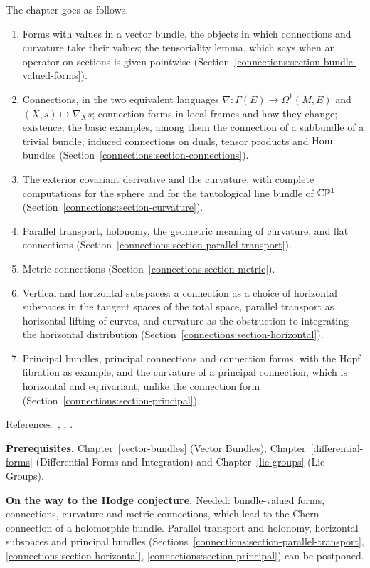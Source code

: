 The chapter goes as follows.
\begin{enumerate}
\item Forms with values in a vector bundle, the objects in which connections and curvature take their values; the tensoriality lemma, which says when an operator on
sections is given pointwise (Section~\ref{connections:section-bundle-valued-forms}).
\item Connections, in the two equivalent languages $\nabla \colon \Gamma(E) \to \Omega^1(M, E)$ and $(X, s) \mapsto \nabla_Xs$; connection forms in local frames and how they
change; existence; the basic examples, among them the connection of a subbundle of a trivial bundle; induced connections on duals, tensor products and
$\operatorname{Hom}$ bundles (Section~\ref{connections:section-connections}).
\item The exterior covariant derivative and the curvature, with complete computations for the sphere and for the tautological line bundle of $\mathbb{C}\mathbb{P}^1$
(Section~\ref{connections:section-curvature}).
\item Parallel transport, holonomy, the geometric meaning of curvature, and flat connections (Section~\ref{connections:section-parallel-transport}).
\item Metric connections (Section~\ref{connections:section-metric}).
\item Vertical and horizontal subspaces: a connection as a choice of horizontal subspaces in the tangent spaces of the total space, parallel transport as horizontal
lifting of curves, and curvature as the obstruction to integrating the horizontal distribution (Section~\ref{connections:section-horizontal}).
\item Principal bundles, principal connections and connection forms, with the Hopf fibration as example, and the curvature of a principal connection, which is horizontal and
equivariant, unlike the connection form (Section~\ref{connections:section-principal}).
\end{enumerate}
References: \cite{kobayashi-nomizu}, \cite{milnor-stasheff}, \cite[Chapter 0]{griffiths-harris}.

\noindent\textbf{Prerequisites.} Chapter~\ref{vector-bundles} (Vector Bundles), Chapter~\ref{differential-forms} (Differential Forms
and Integration) and Chapter~\ref{lie-groups} (Lie Groups).

\noindent\textbf{On the way to the Hodge conjecture.} Needed: bundle-valued forms, connections, curvature and metric connections, which lead to the Chern connection of a holomorphic bundle. Parallel
transport and holonomy, horizontal subspaces and principal bundles (Sections~\ref{connections:section-parallel-transport}, \ref{connections:section-horizontal}, \ref{connections:section-principal}) can be postponed.

